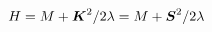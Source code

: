 \begin{equation}
H= M+\mbox{\boldmath$K$}^2/2\lambda = M+\mbox{\boldmath$S$}^2/2\lambda    \label{eq:3s}
\end{equation}

